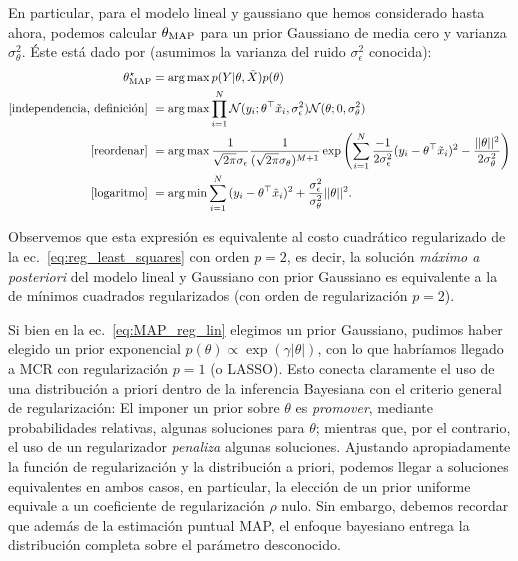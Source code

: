\begin{mdframed}[style=ejemplo, frametitle={\center Ejemplo: Máximo a posterior para el modelo lineal y gaussiano}]
En particular, para el modelo lineal y gaussiano que hemos considerado hasta ahora, podemos calcular $\theta_\text{MAP}$ para un prior Gaussiano de media cero y varianza $\sigma_\theta^2$. Éste está dado por (asumimos la varianza del ruido $\sigma_\epsilon^2$ conocida):	
\begin{align}
	\theta_\text{MAP}^\star 	&= \operatorname*{arg\,max} p(Y|\theta,\tilde{X})p(\theta)\nonumber\\
						\text{[independencia, definición]}\ &= \operatorname*{arg\,max} \prod_{i=1}^N {\mathcal N}(y_i;\theta^\top\tilde{x}_i,\sigma_\epsilon^2){\mathcal N}(\theta;0,\sigma_\theta^2) \nonumber\\
								\text{[reordenar]}\  &= \operatorname*{arg\,max}  \frac{1}{\sqrt{2\pi}\sigma_\epsilon} \frac{1}{(\sqrt{2\pi}\sigma_\theta)^{M+1}} \exp\left( \sum_{i=1}^N{\frac{-1}{2\sigma_\epsilon^2}(y_i-\theta^\top\tilde{x}_i)^2} -{\frac{||\theta||^2}{2\sigma_\theta^2}}\right) \nonumber\\
								\text{[logaritmo]}\  &= \operatorname*{arg\,min} \sum_{i=1}^N{(y_i-\theta^\top\tilde{x}_i)^2} +{\frac{\sigma_\epsilon^2}{\sigma_\theta^2}||\theta||^2}.\label{eq:MAP_reg_lin}
\end{align}

Observemos que esta expresión es equivalente al costo cuadrático regularizado de la ec.~\eqref{eq:reg_least_squares} con orden $p=2$, es decir, la solución \emph{máximo a posteriori} del modelo lineal y Gaussiano con prior Gaussiano es equivalente a la de mínimos cuadrados regularizados (con orden de  regularización $p=2$). 

\end{mdframed}

Si bien en la ec.~\eqref{eq:MAP_reg_lin} elegimos un prior Gaussiano, pudimos haber elegido un prior exponencial $p(\theta)\propto\exp(\gamma|\theta|)$, con lo que habríamos llegado a MCR con regularización $p=1$ (o LASSO). Esto conecta claramente el uso de una distribución a priori dentro de la inferencia Bayesiana con el criterio general de regularización: El imponer un prior sobre $\theta$ es \emph{promover}, mediante probabilidades relativas, algunas soluciones para $\theta$; mientras que, por el contrario, el uso de un regularizador \emph{penaliza} algunas soluciones. Ajustando apropiadamente la función de regularización y la distribución a priori, podemos llegar a soluciones equivalentes en ambos casos, en particular, la elección de un prior uniforme equivale a un coeficiente de regularización $\rho$ nulo. Sin embargo, debemos recordar que además de la estimación puntual MAP, el enfoque bayesiano entrega la distribución completa sobre el parámetro desconocido.  

